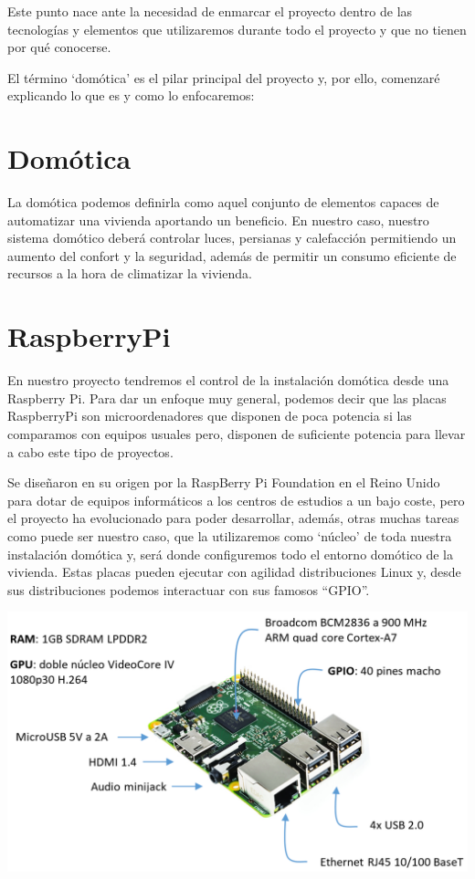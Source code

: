 
Este punto nace ante la necesidad de enmarcar el proyecto dentro de las tecnologías y elementos que utilizaremos durante todo el proyecto y que no tienen por qué conocerse.

El término ‘domótica’ es el pilar principal del proyecto y, por ello, comenzaré explicando lo que es y como lo enfocaremos:

\section{Domótica}
La domótica podemos definirla como aquel conjunto de elementos capaces de automatizar una vivienda aportando un beneficio.
En nuestro caso, nuestro sistema domótico deberá controlar luces, persianas y calefacción permitiendo un aumento del confort y la seguridad, además de permitir un consumo eficiente de recursos a la hora de climatizar la vivienda.

\section{RaspberryPi}
En nuestro proyecto tendremos el control de la instalación domótica desde una Raspberry Pi. 
Para dar un enfoque muy general, podemos decir que las placas RaspberryPi son microordenadores que disponen de poca potencia si las comparamos con equipos usuales pero, disponen de suficiente potencia para llevar a cabo este tipo de proyectos.

Se diseñaron en su origen por la RaspBerry Pi Foundation en el Reino Unido para dotar de equipos informáticos a los centros de estudios a un bajo coste, pero el proyecto ha evolucionado para poder desarrollar, además, otras muchas tareas como puede ser nuestro caso, que la utilizaremos como ‘núcleo’ de toda nuestra instalación domótica y, será donde configuremos todo el entorno domótico de la vivienda.
Estas placas pueden ejecutar con agilidad distribuciones Linux y, desde sus distribuciones podemos interactuar con sus famosos “GPIO”.
\begin{center}
\includegraphics[width=\textwidth]{img/RBP2B.pdf}
\end{center}

